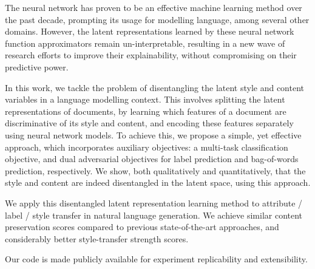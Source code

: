 The neural network has proven to be an effective machine learning method over the past decade, prompting its usage for modelling language, among several other domains. However, the latent representations learned by these neural network function approximators remain un-interpretable, resulting in a new wave of research efforts to improve their explainability, without compromising on their predictive power.

In this work, we tackle the problem of disentangling the latent style and content variables in a language modelling context. This involves splitting the latent representations of documents, by learning which features of a document are discriminative of its style and content, and encoding these features separately using neural network models. To achieve this, we propose a simple, yet effective approach, which incorporates auxiliary objectives: a multi-task classification objective, and dual adversarial objectives for label prediction and bag-of-words prediction, respectively. We show, both qualitatively and quantitatively, that the style and content are indeed disentangled in the latent space, using this approach.

We apply this disentangled latent representation learning method to attribute / label / style transfer in natural language generation. We achieve similar content preservation scores compared to previous state-of-the-art approaches, and considerably better style-transfer strength scores.

Our code is made publicly available for experiment replicability and extensibility.
